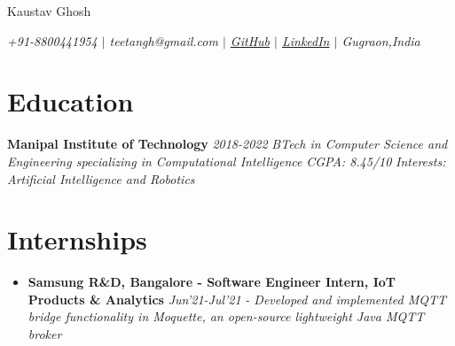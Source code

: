 \documentclass{article}
\makeatletter
\renewcommand{\maketitle}{
    \begin{flushleft}        
        {\huge\rmfamily
        \theauthor}\newline
        \vspace{0.1em}
        \textit{teetangh@gmail.com -- github.com/teetangh}\newline
        \textit{Contact No. -- +91-8800441954}\newline
        \textit{Manipal Institute of Technology}\newline
        \textit{B.Tech in \textbf{Computer Science \& Engineering}}
        \textit{2018 - 2022}\newline
        \textit{Minor in \textbf{Computational Intelligence}}\newline
        \textit{CGPA: 8.45/10}\newline
    \end{flushleft}

}
\makeatother
\begin{document}
\thispagestyle{empty}  %


\begin{center}
    \huge{Kaustav Ghosh}

    \normalsize{
        \textit{
            +91-8800441954 \(|\)
            teetangh@gmail.com \(|\)
            \href{https://www.github.com/teetangh}{GitHub} \(|\)
            \href{https://www.linkedin.com/in/kaustav-ghosh-1538651bb/}{LinkedIn} \(|\)
            Gugraon,India
        }}
\end{center}

\section*{Education}

\textbf{Manipal Institute of Technology} \hfill \textit{2018-2022}
\textmd{\newline \textit{BTech in Computer Science and Engineering specializing in Computational Intelligence}} \hfill \textit{CGPA: 8.45/10}
\textmd{\newline \textit{Interests: Artificial Intelligence and Robotics}}

\section*{Internships}

\begin{itemize}
    \item{\textbf{\large{Samsung R\&D, Bangalore - Software Engineer Intern, IoT Products \& Analytics}}} \hfill \textit{Jun'21-Jul'21}
          \newline
          \textit{- Developed and implemented MQTT bridge functionality in Moquette, an open-source lightweight Java MQTT broker}
\end{itemize}
\end{document}
